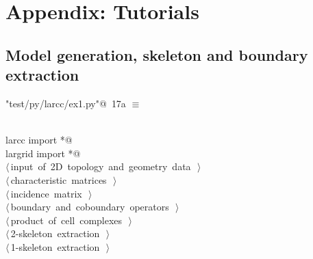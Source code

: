 \documentclass[11pt,oneside]{article}	%
\begin{document}


\appendix

\section{Appendix: Tutorials}


\subsection{Model generation, skeleton and boundary extraction}

\begin{flushleft} \small
\begin{minipage}{\linewidth} \label{scrap32}
\protect{}\verb@"test/py/larcc/ex1.py"@\nobreak\ {\footnotesize 17a }$\equiv$
\vspace{-1ex}
\begin{list}{}{} \item
\mbox{}\verb@@\\
\mbox{}\verb@from larcc import *@\\
\mbox{}\verb@from largrid import *@\\
\mbox{}\verb@@\hbox{$\langle\,$input of 2D topology and geometry data\nobreak\ {\footnotesize {}}$\,\rangle$}\verb@@\\
\mbox{}\verb@@\hbox{$\langle\,$characteristic matrices\nobreak\ {\footnotesize {}}$\,\rangle$}\verb@@\\
\mbox{}\verb@@\hbox{$\langle\,$incidence matrix\nobreak\ {\footnotesize {}}$\,\rangle$}\verb@@\\
\mbox{}\verb@@\hbox{$\langle\,$boundary and coboundary operators\nobreak\ {\footnotesize {}}$\,\rangle$}\verb@@\\
\mbox{}\verb@@\hbox{$\langle\,$product of cell complexes\nobreak\ {\footnotesize {}}$\,\rangle$}\verb@@\\
\mbox{}\verb@@\hbox{$\langle\,$2-skeleton extraction\nobreak\ {\footnotesize {}}$\,\rangle$}\verb@@\\
\mbox{}\verb@@\hbox{$\langle\,$1-skeleton extraction\nobreak\ {\footnotesize {}}$\,\rangle$}\verb@@\\

\end{list}
\end{minipage}
\end{flushleft}
\end{document}
